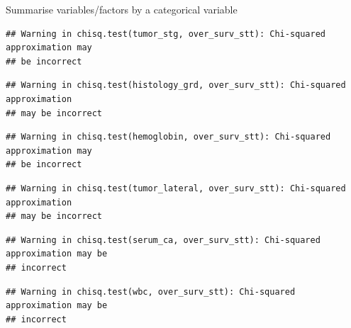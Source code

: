 \documentclass[]{article}
\newenvironment{Shaded}{\begin{snugshade}}{\end{snugshade}}
\newcommand{\KeywordTok}[1]{\textcolor[rgb]{0.13,0.29,0.53}{\textbf{#1}}}
\newcommand{\DataTypeTok}[1]{\textcolor[rgb]{0.13,0.29,0.53}{#1}}
\newcommand{\StringTok}[1]{\textcolor[rgb]{0.31,0.60,0.02}{#1}}
\newcommand{\CommentTok}[1]{\textcolor[rgb]{0.56,0.35,0.01}{\textit{#1}}}
\newcommand{\OtherTok}[1]{\textcolor[rgb]{0.56,0.35,0.01}{#1}}
\newcommand{\OperatorTok}[1]{\textcolor[rgb]{0.81,0.36,0.00}{\textbf{#1}}}
\newcommand{\NormalTok}[1]{#1}
\begin{document}
Summarise variables/factors by a categorical variable

\begin{Shaded}
\end{Shaded}

\begin{verbatim}
## Warning in chisq.test(tumor_stg, over_surv_stt): Chi-squared approximation may
## be incorrect
\end{verbatim}

\begin{verbatim}
## Warning in chisq.test(histology_grd, over_surv_stt): Chi-squared approximation
## may be incorrect
\end{verbatim}

\begin{verbatim}
## Warning in chisq.test(hemoglobin, over_surv_stt): Chi-squared approximation may
## be incorrect
\end{verbatim}

\begin{verbatim}
## Warning in chisq.test(tumor_lateral, over_surv_stt): Chi-squared approximation
## may be incorrect
\end{verbatim}

\begin{verbatim}
## Warning in chisq.test(serum_ca, over_surv_stt): Chi-squared approximation may be
## incorrect
\end{verbatim}

\begin{verbatim}
## Warning in chisq.test(wbc, over_surv_stt): Chi-squared approximation may be
## incorrect
\end{verbatim}
\end{document}
